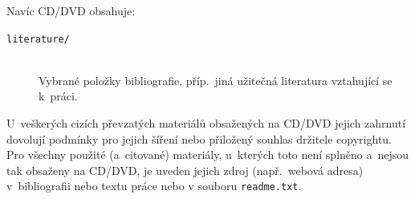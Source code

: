 \documentclass[
  biblatex=false,
  font=serif,
  glossaries=false,
  tables=false,
  theorems=false,
  index
]{kidiplom}
\begin{document}
Navíc CD/DVD obsahuje:

\begin{description}
\item[\texttt{literature/}] \hfill \\
  Vybrané položky bibliografie, příp.~jiná užitečná literatura
  vztahující se k~práci.
\end{description}

U~veškerých cizích převzatých materiálů obsažených na CD/DVD jejich
zahrnutí dovolují podmínky pro jejich šíření nebo přiložený souhlas
držitele copyrightu. Pro všechny použité (a~citované) materiály,
u~kterých toto není splněno a~nejsou tak obsaženy na CD/DVD, je uveden
jejich zdroj (např.~webová adresa) v~bibliografii nebo textu práce
nebo v souboru \texttt{readme.txt}.




\nocite{*}


\newpage
\end{document}
